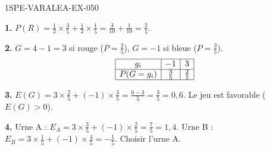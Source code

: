 \begin{corrige}{1SPE-VARALEA-EX-050}

\textbf{1.} $P(R) = \frac{1}{2} \times \frac{3}{5} + \frac{1}{2} \times \frac{1}{5} = \frac{3}{10} + \frac{1}{10} = \frac{2}{5}$.

\medskip
\textbf{2.} $G = 4-1 = 3$ si rouge ($P = \frac{2}{5}$), $G = -1$ si bleue ($P = \frac{3}{5}$).
\[
\begin{array}{|c|c|c|}
\hline
g_i & -1 & 3 \\
\hline
P(G=g_i) & \frac{3}{5} & \frac{2}{5} \\
\hline
\end{array}
\]

\medskip
\textbf{3.} $E(G) = 3 \times \frac{2}{5} + (-1) \times \frac{3}{5} = \frac{6-3}{5} = \frac{3}{5} = 0{,}6$. Le jeu est favorable ($E(G) > 0$).

\medskip
\textbf{4.} Urne A : $E_A = 3 \times \frac{3}{5} + (-1) \times \frac{2}{5} = \frac{7}{5} = 1{,}4$. Urne B : $E_B = 3 \times \frac{1}{5} + (-1) \times \frac{4}{5} = -\frac{1}{5}$. Choisir l'urne A.

\end{corrige}
